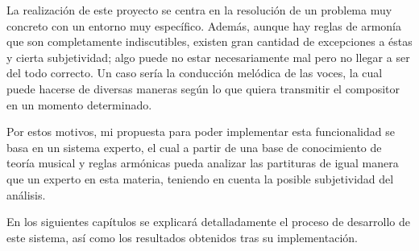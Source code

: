 La realización de este proyecto se centra en la resolución de un problema muy concreto con un entorno muy específico. Además, aunque hay reglas de armonía que son completamente indiscutibles, existen gran cantidad de excepciones a éstas y cierta subjetividad; algo puede no estar necesariamente mal pero no llegar a ser del todo correcto. Un caso sería la conducción melódica de las voces, la cual puede hacerse de diversas maneras según lo que quiera transmitir el compositor en un momento determinado.

Por estos motivos, mi propuesta para poder implementar esta funcionalidad se basa en un sistema experto, el cual a partir de una base de conocimiento de teoría musical y reglas armónicas pueda analizar las partituras de igual manera que un experto en esta materia, teniendo en cuenta la posible subjetividad del análisis.

En los siguientes capítulos se explicará detalladamente el proceso de desarrollo de este sistema, así como los resultados obtenidos tras su implementación. 